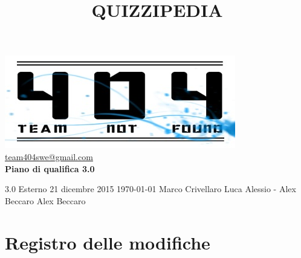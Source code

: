 \documentclass[a4paper,11pt]{article}
\title{\textbf{{\fontsize{8mm}{5mm}\selectfont QUIZZIPEDIA}}}
\date{}
\author{}
\begin{document}
	\maketitle
	\thispagestyle{empty}
	\begin{center}	
	\includegraphics{../../team_not_found}
	\fontsize{5mm}{3mm}\url{team404swe@gmail.com}\\
	
	\vspace{50mm}
	\textbf{Piano di qualifica 3.0}
	\end{center}
			{3.0} 							%
			{Esterno} 						%
			{21 dicembre 2015} 				%
			{\today} 						%
			{Marco Crivellaro}	%
			{Luca Alessio - Alex Beccaro} 	%
			{Alex Beccaro} 			%
	\newpage
	\thispagestyle{empty}
	\null  %

	\newpage
	\newpage
	\fancyfoot[R]{\thepage}
	
	\hspace{30 mm}
	\section*{Registro delle modifiche}
	
\end{document}

